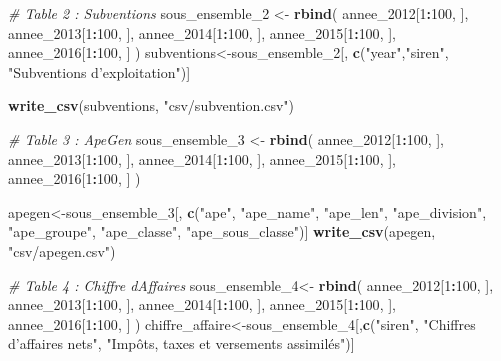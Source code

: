 \documentclass[mstat,12pt]{unswthesis}
\newenvironment{Shaded}{\begin{snugshade}}{\end{snugshade}}
\newcommand{\CommentTok}[1]{\textcolor[rgb]{0.56,0.35,0.01}{\textit{#1}}}
\newcommand{\DecValTok}[1]{\textcolor[rgb]{0.00,0.00,0.81}{#1}}
\newcommand{\FunctionTok}[1]{\textcolor[rgb]{0.13,0.29,0.53}{\textbf{#1}}}
\newcommand{\NormalTok}[1]{#1}
\newcommand{\OtherTok}[1]{\textcolor[rgb]{0.56,0.35,0.01}{#1}}
\newcommand{\SpecialCharTok}[1]{\textcolor[rgb]{0.81,0.36,0.00}{\textbf{#1}}}
\newcommand{\StringTok}[1]{\textcolor[rgb]{0.31,0.60,0.02}{#1}}
\begin{document}
\begin{Shaded}
\begin{Highlighting}[]
\CommentTok{\# Table 2 : Subventions}
\NormalTok{sous\_ensemble\_2 }\OtherTok{\textless{}{-}} \FunctionTok{rbind}\NormalTok{(}
\NormalTok{  annee\_2012[}\DecValTok{1}\SpecialCharTok{:}\DecValTok{100}\NormalTok{, ],}
\NormalTok{  annee\_2013[}\DecValTok{1}\SpecialCharTok{:}\DecValTok{100}\NormalTok{, ],}
\NormalTok{  annee\_2014[}\DecValTok{1}\SpecialCharTok{:}\DecValTok{100}\NormalTok{, ],}
\NormalTok{  annee\_2015[}\DecValTok{1}\SpecialCharTok{:}\DecValTok{100}\NormalTok{, ],}
\NormalTok{  annee\_2016[}\DecValTok{1}\SpecialCharTok{:}\DecValTok{100}\NormalTok{, ]}
\NormalTok{)}
\NormalTok{subventions}\OtherTok{\textless{}{-}}\NormalTok{sous\_ensemble\_2[, }\FunctionTok{c}\NormalTok{(}\StringTok{"year"}\NormalTok{,}\StringTok{"siren"}\NormalTok{, }\StringTok{"Subventions d’exploitation"}\NormalTok{)]}


\FunctionTok{write\_csv}\NormalTok{(subventions, }\StringTok{"csv/subvention.csv"}\NormalTok{)}

\CommentTok{\# Table 3 : ApeGen}
\NormalTok{sous\_ensemble\_3 }\OtherTok{\textless{}{-}} \FunctionTok{rbind}\NormalTok{(}
\NormalTok{  annee\_2012[}\DecValTok{1}\SpecialCharTok{:}\DecValTok{100}\NormalTok{, ],}
\NormalTok{  annee\_2013[}\DecValTok{1}\SpecialCharTok{:}\DecValTok{100}\NormalTok{, ],}
\NormalTok{  annee\_2014[}\DecValTok{1}\SpecialCharTok{:}\DecValTok{100}\NormalTok{, ],}
\NormalTok{  annee\_2015[}\DecValTok{1}\SpecialCharTok{:}\DecValTok{100}\NormalTok{, ],}
\NormalTok{  annee\_2016[}\DecValTok{1}\SpecialCharTok{:}\DecValTok{100}\NormalTok{, ]}
\NormalTok{)}


\NormalTok{apegen}\OtherTok{\textless{}{-}}\NormalTok{sous\_ensemble\_3[, }\FunctionTok{c}\NormalTok{(}\StringTok{"ape"}\NormalTok{, }\StringTok{"ape\_name"}\NormalTok{, }\StringTok{"ape\_len"}\NormalTok{, }\StringTok{"ape\_division"}\NormalTok{, }\StringTok{"ape\_groupe"}\NormalTok{, }\StringTok{"ape\_classe"}\NormalTok{, }\StringTok{"ape\_sous\_classe"}\NormalTok{)]}
\FunctionTok{write\_csv}\NormalTok{(apegen, }\StringTok{"csv/apegen.csv"}\NormalTok{)}

\CommentTok{\# Table 4 : Chiffre d\textquotesingle{}Affaires}
\NormalTok{sous\_ensemble\_4}\OtherTok{\textless{}{-}} \FunctionTok{rbind}\NormalTok{(}
\NormalTok{  annee\_2012[}\DecValTok{1}\SpecialCharTok{:}\DecValTok{100}\NormalTok{, ],}
\NormalTok{  annee\_2013[}\DecValTok{1}\SpecialCharTok{:}\DecValTok{100}\NormalTok{, ],}
\NormalTok{  annee\_2014[}\DecValTok{1}\SpecialCharTok{:}\DecValTok{100}\NormalTok{, ],}
\NormalTok{  annee\_2015[}\DecValTok{1}\SpecialCharTok{:}\DecValTok{100}\NormalTok{, ],}
\NormalTok{  annee\_2016[}\DecValTok{1}\SpecialCharTok{:}\DecValTok{100}\NormalTok{, ]}
\NormalTok{)}
\NormalTok{chiffre\_affaire}\OtherTok{\textless{}{-}}\NormalTok{sous\_ensemble\_4[,}\FunctionTok{c}\NormalTok{(}\StringTok{"siren"}\NormalTok{, }\StringTok{"Chiffres d’affaires nets"}\NormalTok{, }\StringTok{"Impôts, taxes et versements assimilés"}\NormalTok{)]}


\end{Highlighting}
\end{Shaded}
\end{document}

